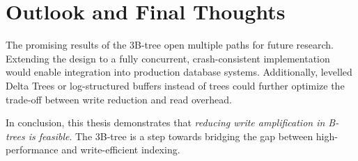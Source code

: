 \section{Outlook and Final Thoughts}
The promising results of the 3B-tree open multiple paths for future research. 
Extending the design to a fully concurrent, crash-consistent implementation would enable integration into production database systems. 
Additionally, levelled Delta Trees or log-structured buffers instead of trees could further optimize the trade-off between write reduction and read overhead.

\bigskip

In conclusion, this thesis demonstrates that \emph{reducing write amplification in B-trees is feasible}. 
The 3B-tree is a step towards bridging the gap between high-performance and write-efficient indexing.
